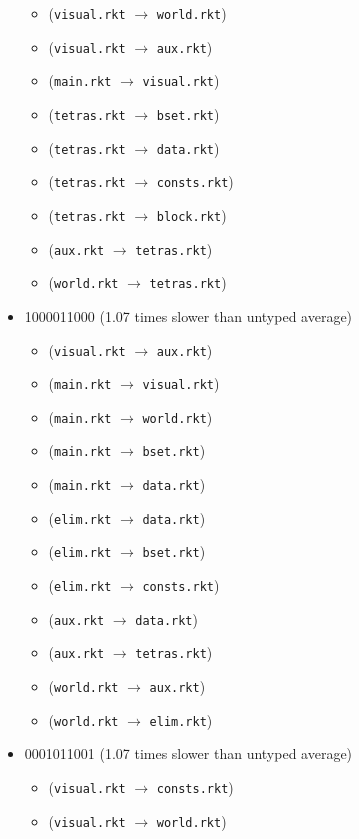 \documentclass{article}
\newcommand{\mono}[1]{\texttt{#1}}
\begin{document}
\begin{itemize}
\begin{itemize}
  \item (\mono{visual.rkt} $\rightarrow$ \mono{world.rkt})
  \item (\mono{visual.rkt} $\rightarrow$ \mono{aux.rkt})
  \item (\mono{main.rkt} $\rightarrow$ \mono{visual.rkt})
  \item (\mono{tetras.rkt} $\rightarrow$ \mono{bset.rkt})
  \item (\mono{tetras.rkt} $\rightarrow$ \mono{data.rkt})
  \item (\mono{tetras.rkt} $\rightarrow$ \mono{consts.rkt})
  \item (\mono{tetras.rkt} $\rightarrow$ \mono{block.rkt})
  \item (\mono{aux.rkt} $\rightarrow$ \mono{tetras.rkt})
  \item (\mono{world.rkt} $\rightarrow$ \mono{tetras.rkt})
  \end{itemize}
\item 1000011000 (1.07 times slower than untyped average)
  \begin{itemize}
  \item (\mono{visual.rkt} $\rightarrow$ \mono{aux.rkt})
  \item (\mono{main.rkt} $\rightarrow$ \mono{visual.rkt})
  \item (\mono{main.rkt} $\rightarrow$ \mono{world.rkt})
  \item (\mono{main.rkt} $\rightarrow$ \mono{bset.rkt})
  \item (\mono{main.rkt} $\rightarrow$ \mono{data.rkt})
  \item (\mono{elim.rkt} $\rightarrow$ \mono{data.rkt})
  \item (\mono{elim.rkt} $\rightarrow$ \mono{bset.rkt})
  \item (\mono{elim.rkt} $\rightarrow$ \mono{consts.rkt})
  \item (\mono{aux.rkt} $\rightarrow$ \mono{data.rkt})
  \item (\mono{aux.rkt} $\rightarrow$ \mono{tetras.rkt})
  \item (\mono{world.rkt} $\rightarrow$ \mono{aux.rkt})
  \item (\mono{world.rkt} $\rightarrow$ \mono{elim.rkt})
  \end{itemize}
\item 0001011001 (1.07 times slower than untyped average)
  \begin{itemize}
  \item (\mono{visual.rkt} $\rightarrow$ \mono{consts.rkt})
  \item (\mono{visual.rkt} $\rightarrow$ \mono{world.rkt})

\end{itemize}
\end{itemize}
\end{document}
